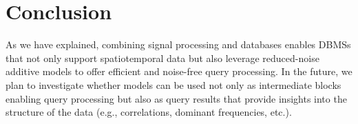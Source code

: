 \section{Conclusion}
As we have explained, combining signal processing and databases enables DBMSs that not only support spatiotemporal data but also leverage reduced-noise additive models to offer efficient and noise-free query processing. In the future, we plan to investigate whether models can be used not only as intermediate blocks enabling query processing but also as query results that provide insights into the structure of the data (e.g.,  correlations, dominant frequencies, etc.).
\label{sec:conclusion}